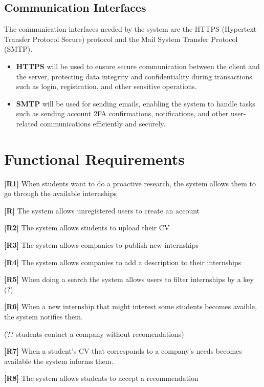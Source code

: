 \subsection{Communication Interfaces}
The communication interfaces needed by the system are the HTTPS (Hypertext Transfer Protocol Secure) protocol and the Mail System Transfer Protocol (SMTP). 

\begin{itemize}
    \item \textbf{HTTPS} will be used to ensure secure communication between the client and the server, protecting data integrity and confidentiality during transactions such as login, registration, and other sensitive operations.
    
    \item \textbf{SMTP} will be used for sending emails, enabling the system to handle tasks such as sending account 2FA confirmations, notifications, and other user-related communications efficiently and securely.

\end{itemize}

\section{Functional Requirements}

\textbf{[R1]} When students want to do a proactive research, the system allows them to go through the available internships

\textbf{[R]} The system allows unregistered users to create an account

\textbf{[R2]} The system allows students to upload their CV

\textbf{[R3]} The system allows companies to publish new internships

\textbf{[R4]} The system allows companies to add a description to their internships

\textbf{[R5]} When doing a search the system allows users to filter internships by a key (?)

\textbf{[R6]} When a new internship that might interest some students becomes avaible, the system notifies them.

(?? students contact a company without recomendations)

\textbf{[R7]} When a student's CV that corresponds to a company's needs becomes available the system informs them. 

\textbf{[R8]} The system allows students to accept a recommendation

